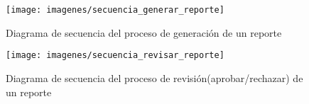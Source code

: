 \begin{landscape}
\begin{figure}
  \centering
  \texttt{[image: imagenes/secuencia\_generar\_reporte]}
  \caption{Diagrama de secuencia del proceso de generación de un reporte}
  \label{fig:secuenciaGenerarReporte}
\end{figure}
\end{landscape}

\begin{landscape}
\begin{figure}
  \centering
  \texttt{[image: imagenes/secuencia\_revisar\_reporte]}
  \caption{Diagrama de secuencia del proceso de revisión(aprobar/rechazar) de un reporte}
  \label{fig:secuenciaRevisarReporte}
\end{figure}
\end{landscape}
